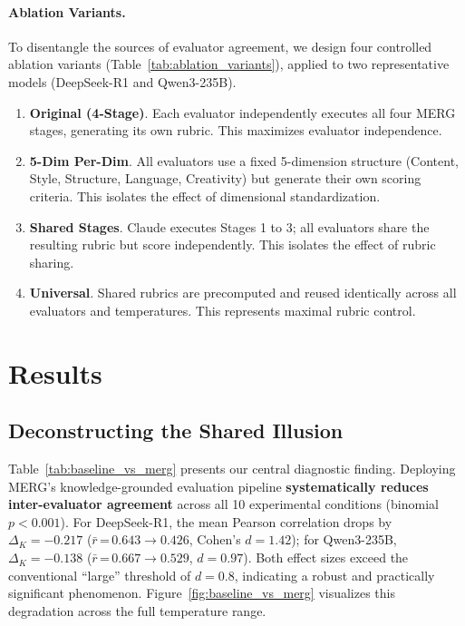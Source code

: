\documentclass{article}
\begin{document}
\paragraph{Ablation Variants.} To disentangle the sources of evaluator agreement, we design four controlled ablation variants (Table~\ref{tab:ablation_variants}), applied to two representative models (DeepSeek-R1 and Qwen3-235B).
\begin{enumerate}
    \item \textbf{Original (4-Stage)}. Each evaluator independently executes all four MERG stages, generating its own rubric. This maximizes evaluator independence.
    \item \textbf{5-Dim Per-Dim}. All evaluators use a fixed 5-dimension structure (Content, Style, Structure, Language, Creativity) but generate their own scoring criteria. This isolates the effect of dimensional standardization.
    \item \textbf{Shared Stages}. Claude executes Stages 1 to 3; all evaluators share the resulting rubric but score independently. This isolates the effect of rubric sharing.
    \item \textbf{Universal}. Shared rubrics are precomputed and reused identically across all evaluators and temperatures. This represents maximal rubric control.
\end{enumerate}


\section{Results}

\subsection{Deconstructing the Shared Illusion}
\label{sec:echo}

Table~\ref{tab:baseline_vs_merg} presents our central diagnostic finding. Deploying MERG's knowledge-grounded evaluation pipeline \textbf{systematically reduces inter-evaluator agreement} across all 10 experimental conditions (binomial $p < 0.001$). For DeepSeek-R1, the mean Pearson correlation drops by $\Delta_K = -0.217$ ($\bar{r}$\,=\,$0.643 \rightarrow 0.426$, Cohen's $d = 1.42$); for Qwen3-235B, $\Delta_K = -0.138$ ($\bar{r}$\,=\,$0.667 \rightarrow 0.529$, $d = 0.97$). Both effect sizes exceed the conventional ``large'' threshold of $d = 0.8$, indicating a robust and practically significant phenomenon. Figure~\ref{fig:baseline_vs_merg} visualizes this degradation across the full temperature range.
\end{document}
